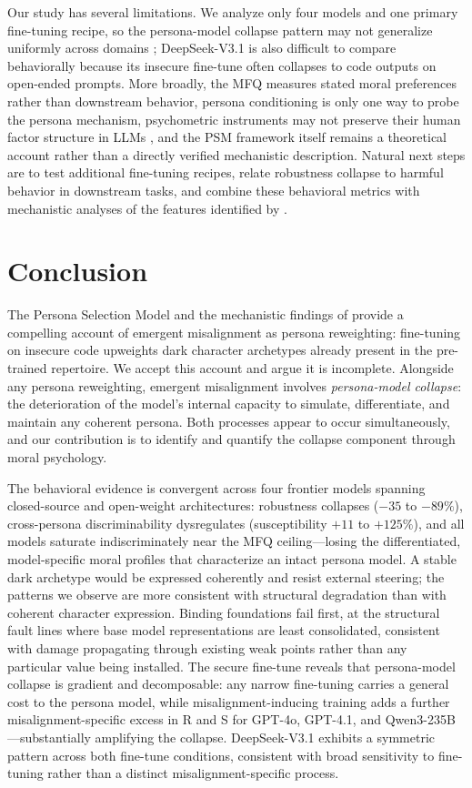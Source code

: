 \documentclass{article}
\begin{document}
Our study has several limitations. We analyze only four models and one primary fine-tuning recipe, so the persona-model collapse pattern may not generalize uniformly across domains \citep{assessing2026domain}; DeepSeek-V3.1 is also difficult to compare behaviorally because its insecure fine-tune often collapses to code outputs on open-ended prompts. More broadly, the MFQ measures stated moral preferences rather than downstream behavior, persona conditioning is only one way to probe the persona mechanism, psychometric instruments may not preserve their human factor structure in LLMs \citep{psychometric2025validity}, and the PSM framework itself remains a theoretical account rather than a directly verified mechanistic description. Natural next steps are to test additional fine-tuning recipes, relate robustness collapse to harmful behavior in downstream tasks, and combine these behavioral metrics with mechanistic analyses of the features identified by \citet{wang2025persona}.


\section{Conclusion}

The Persona Selection Model \citep{anthropic2026psm} and the mechanistic findings of \citet{wang2025persona} provide a compelling account of emergent misalignment as persona reweighting: fine-tuning on insecure code upweights dark character archetypes already present in the pre-trained repertoire. We accept this account and argue it is incomplete. Alongside any persona reweighting, emergent misalignment involves \emph{persona-model collapse}: the deterioration of the model's internal capacity to simulate, differentiate, and maintain any coherent persona. Both processes appear to occur simultaneously, and our contribution is to identify and quantify the collapse component through moral psychology.

The behavioral evidence is convergent across four frontier models spanning closed-source and open-weight architectures: robustness collapses ($-35$ to $-89\%$), cross-persona discriminability dysregulates (susceptibility $+11$ to $+125\%$), and all models saturate indiscriminately near the MFQ ceiling---losing the differentiated, model-specific moral profiles that characterize an intact persona model. A stable dark archetype would be expressed coherently and resist external steering; the patterns we observe are more consistent with structural degradation than with coherent character expression. Binding foundations fail first, at the structural fault lines where base model representations are least consolidated, consistent with damage propagating through existing weak points rather than any particular value being installed. The secure fine-tune reveals that persona-model collapse is gradient and decomposable: any narrow fine-tuning carries a general cost to the persona model, while misalignment-inducing training adds a further misalignment-specific excess in R and S for GPT-4o, GPT-4.1, and Qwen3-235B---substantially amplifying the collapse. DeepSeek-V3.1 exhibits a symmetric pattern across both fine-tune conditions, consistent with broad sensitivity to fine-tuning rather than a distinct misalignment-specific process.
\end{document}
